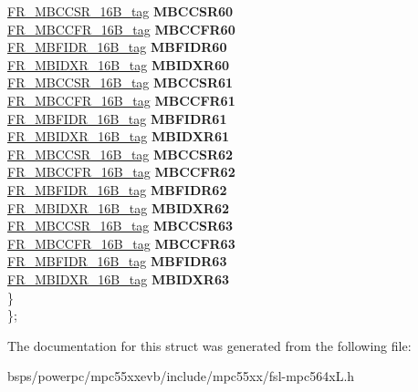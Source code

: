 \begin{DoxyCompactItemize}
\begin{tabbing}
\>\>\mbox{\hyperlink{unionFR__MBCCSR__16B__tag}{FR\_MBCCSR\_16B\_tag}} {\bfseries MBCCSR60}\\
\>\>\mbox{\hyperlink{unionFR__MBCCFR__16B__tag}{FR\_MBCCFR\_16B\_tag}} {\bfseries MBCCFR60}\\
\>\>\mbox{\hyperlink{unionFR__MBFIDR__16B__tag}{FR\_MBFIDR\_16B\_tag}} {\bfseries MBFIDR60}\\
\>\>\mbox{\hyperlink{unionFR__MBIDXR__16B__tag}{FR\_MBIDXR\_16B\_tag}} {\bfseries MBIDXR60}\\
\>\>\mbox{\hyperlink{unionFR__MBCCSR__16B__tag}{FR\_MBCCSR\_16B\_tag}} {\bfseries MBCCSR61}\\
\>\>\mbox{\hyperlink{unionFR__MBCCFR__16B__tag}{FR\_MBCCFR\_16B\_tag}} {\bfseries MBCCFR61}\\
\>\>\mbox{\hyperlink{unionFR__MBFIDR__16B__tag}{FR\_MBFIDR\_16B\_tag}} {\bfseries MBFIDR61}\\
\>\>\mbox{\hyperlink{unionFR__MBIDXR__16B__tag}{FR\_MBIDXR\_16B\_tag}} {\bfseries MBIDXR61}\\
\>\>\mbox{\hyperlink{unionFR__MBCCSR__16B__tag}{FR\_MBCCSR\_16B\_tag}} {\bfseries MBCCSR62}\\
\>\>\mbox{\hyperlink{unionFR__MBCCFR__16B__tag}{FR\_MBCCFR\_16B\_tag}} {\bfseries MBCCFR62}\\
\>\>\mbox{\hyperlink{unionFR__MBFIDR__16B__tag}{FR\_MBFIDR\_16B\_tag}} {\bfseries MBFIDR62}\\
\>\>\mbox{\hyperlink{unionFR__MBIDXR__16B__tag}{FR\_MBIDXR\_16B\_tag}} {\bfseries MBIDXR62}\\
\>\>\mbox{\hyperlink{unionFR__MBCCSR__16B__tag}{FR\_MBCCSR\_16B\_tag}} {\bfseries MBCCSR63}\\
\>\>\mbox{\hyperlink{unionFR__MBCCFR__16B__tag}{FR\_MBCCFR\_16B\_tag}} {\bfseries MBCCFR63}\\
\>\>\mbox{\hyperlink{unionFR__MBFIDR__16B__tag}{FR\_MBFIDR\_16B\_tag}} {\bfseries MBFIDR63}\\
\>\>\mbox{\hyperlink{unionFR__MBIDXR__16B__tag}{FR\_MBIDXR\_16B\_tag}} {\bfseries MBIDXR63}\\
\>\} \\
\}; \\

\end{tabbing}\end{DoxyCompactItemize}


The documentation for this struct was generated from the following file\+:\begin{DoxyCompactItemize}
\item 
bsps/powerpc/mpc55xxevb/include/mpc55xx/fsl-\/mpc564x\+L.\+h\end{DoxyCompactItemize}
